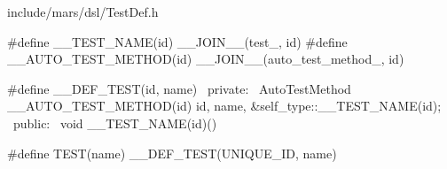 \begin{content}
\begin{nodiff}{include/mars/dsl/TestDef.h}
\begin{c++}
#define __TEST_NAME(id) __JOIN__(test_, id)
#define __AUTO_TEST_METHOD(id)  __JOIN__(auto_test_method_, id)

#define __DEF_TEST(id, name)                                                   \
private:                                                                       \
AutoTestMethod __AUTO_TEST_METHOD(id) {id, name, &self_type::__TEST_NAME(id)}; \
public:                                                                        \
void __TEST_NAME(id)()

#define TEST(name) __DEF_TEST(UNIQUE_ID, name)

 \end{c++}
\end{nodiff}

\end{content}